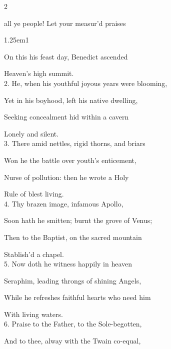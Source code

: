 \begin{paracol}{2}
	\sloppy
	
\vspace{-1\baselineskip}
	
\firstEvensong\label{BenedictEvensong}

\firstEvensongHymn

 all ye people! Let your measur'd praises

\begin{hangparas}{1.25em}{1}
	
On this his feast day, Benedict ascended

Heaven's high summit.\\

2. He, when his youthful joyous years were blooming,

Yet in his boyhood, left his native dwelling,

Seeking concealment hid within a cavern

Lonely and silent.\\

3. There amid nettles, rigid thorns, and briars

Won he the battle over youth's enticement,

Nurse of pollution: then he wrote a Holy

Rule of blest living.\\

4. Thy brazen image, infamous Apollo,

Soon hath he smitten; burnt the grove of Venus;

Then to the Baptist, on the sacred mountain

Stablish'd a chapel.\\

5. Now doth he witness happily in heaven

Seraphim, leading throngs of shining Angels,

While he refreshes faithful hearts who need him

With living waters.\\

6. Praise to the Father, to the Sole-begotten,

And to thee, alway with the Twain co-equal,


\end{hangparas}
\end{paracol}
